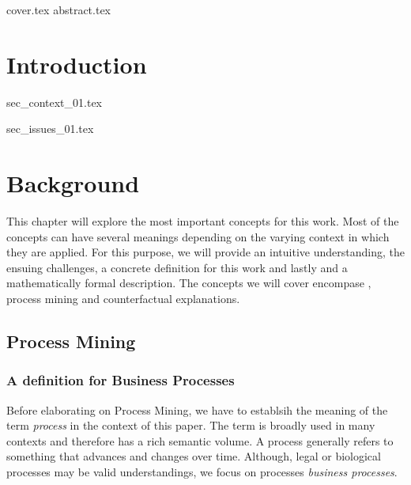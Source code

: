 \documentclass[12pt,a4paper]{report}
\begin{document}
{cover.tex}
{abstract.tex}


\tableofcontents
\printglossary[type=acronym, title=List of terms, toctitle=List of terms]


\chapter{Introduction}
\label{sec:intro}

{sec_context_01.tex}

{sec_issues_01.tex}

\chapter{Background}
\label{sec:prereq}
This chapter will explore the most important concepts for this work. Most of the concepts can have several meanings depending on the varying context in which they are applied. For this purpose, we will provide an intuitive understanding, the ensuing challenges, a concrete definition for this work and lastly and a mathematically formal description. The concepts we will cover encompase , process mining and counterfactual explanations.


\section{Process Mining}

\subsection{A definition for Business Processes}
Before elaborating on Process Mining, we have to establsih the meaning of the term \emph{process} in the context of this paper. The term is broadly used in many contexts and therefore has a rich semantic volume. A process generally refers to something that advances and changes over time\autocite{_DefinitionPROCESS_}.
Although, legal or biological processes may be valid understandings, we focus on processes \emph{business processes}.
\end{document}
